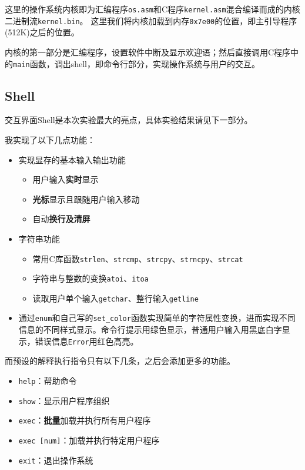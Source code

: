 \documentclass[logo,reportComp]{thesis}
\begin{document}
这里的操作系统内核即为汇编程序\verb'os.asm'和C程序\verb'kernel.asm'混合编译而成的内核二进制流\verb'kernel.bin'。
这里我们将内核加载到内存\verb'0x7e00'的位置，即主引导程序(512K)之后的位置。

内核的第一部分是汇编程序，设置软件中断及显示欢迎语；然后直接调用C程序中的\verb'main'函数，调出shell，即命令行部分，实现操作系统与用户的交互。

\subsection{Shell}
交互界面Shell是本次实验最大的亮点，具体实验结果请见下一部分。

我实现了以下几点功能：
\begin{itemize}
    \item 实现显存的基本输入输出功能
    \begin{itemize}
        \item 用户输入\textbf{实时}显示
        \item \textbf{光标}显示且跟随用户输入移动
        \item 自动\textbf{换行及清屏}
    \end{itemize}
    \item 字符串功能
    \begin{itemize}
        \item 常用C库函数\verb'strlen'、\verb'strcmp'、\verb'strcpy'、\verb'strncpy'、\verb'strcat'
        \item 字符串与整数的变换\verb'atoi'、\verb'itoa'
        \item 读取用户单个输入\verb'getchar'、整行输入\verb'getline'
    \end{itemize}
    \item 通过\verb'enum'和自己写的\verb'set_color'函数实现简单的字符属性变换，进而实现不同信息的不同样式显示。命令行提示用绿色显示，普通用户输入用黑底白字显示，错误信息\verb'Error'用红色高亮。
\end{itemize}

而预设的解释执行指令只有以下几条，之后会添加更多的功能。
\begin{itemize}
    \item \verb'help'：帮助命令
    \item \verb'show'：显示用户程序组织
    \item \verb'exec'：\textbf{批量}加载并执行所有用户程序
    \item \verb'exec [num]'：加载并执行特定用户程序
    \item \verb'exit'：退出操作系统
\end{itemize}
\end{document}
